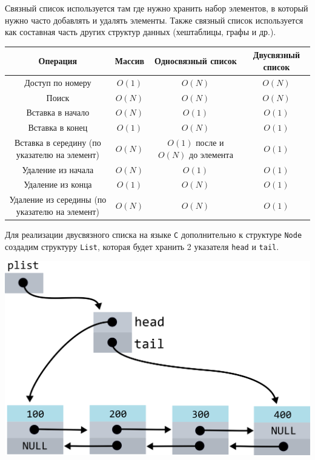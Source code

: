 \documentclass{article}
\begin{document}
Связный список используется там где нужно хранить набор элементов, в который нужно часто добавлять и удалять элементы.
Также связный список используется как составная часть других структур данных (хештаблицы, графы и др.).
\begin{center}
\begin{tabular}{ c c c c }
 Операция & Массив & Односвязный список & Двусвязный список\\ 
 \hline
 Доступ по номеру & $O(1)$ & $O(N)$ & $O(N)$  \\
 Поиск & $O(N)$ & $O(N)$ & $O(N)$  \\    
 Вставка в начало & $O(N)$ & $O(1)$ & $O(1)$  \\
 Вставка в конец & $O(1)$ & $O(N)$ & $O(1)$  \\
 Вставка в середину (по указателю на элемент) & $O(N)$ & $O(1)$ после и $O(N)$ до элемента & $O(1)$  \\
 Удаление из начала & $O(N)$ & $O(1)$ & $O(1)$  \\
 Удаление из конца & $O(1)$ & $O(N)$ & $O(1)$  \\
 Удаление из середины (по указателю на элемент) & $O(N)$ & $O(N)$ & $O(1)$  \\
\end{tabular}
\end{center}

Для реализации двусвязного списка на языке \texttt{C} дополнительно к структуре \texttt{Node} создадим структуру \texttt{List}, которая будет хранить 2 указателя \texttt{head} и \texttt{tail}.

\begin{center}
\includegraphics[scale=1]{../images/doublylist/doublylist_overview.png}
\end{center}
\end{document}
